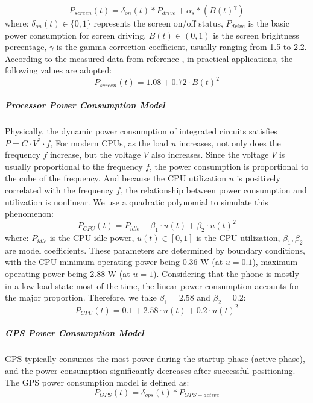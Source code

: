 \documentclass{mcmthesis}
\begin{document}
\begin{equation}
   P_{screen}(t)=\delta _{on}(t)*P_{drive}+\alpha_s*(B(t)^\gamma)
\end{equation}
where:
$\delta_{on}(t) \in \{0,1\}$ represents the screen on/off status,
$P_{drive}$ is the basic power consumption for screen driving,
$B(t) \in (0,1)$ is the screen brightness percentage,
$\gamma$ is the gamma correction coefficient, usually ranging from 1.5 to 2.2.
According to the measured data from reference \cite{Carroll2010Power},
 in practical applications, the following values are adopted:
\begin{equation}
    P_{screen}(t) = 1.08 + 0.72 \cdot B(t)^{2} 
\end{equation}
\subparagraph{Processor Power Consumption Model}
Physically, the dynamic power consumption of integrated circuits satisfies $P = C \cdot V^2 \cdot f$,
For modern CPUs, as the load $u$ increases, not only does the frequency $f$ increase, but the voltage $V$ also increases.
Since the voltage $V$ is usually proportional to the frequency $f$, the power consumption is proportional to the cube of the frequency.
And because the CPU utilization $u$ is positively correlated with the frequency $f$, the relationship between power consumption and utilization is nonlinear.
We use a quadratic polynomial to simulate this phenomenon:
\begin{equation}
    P_{CPU}(t) = P_{idle} + \beta _1 \cdot u(t) + \beta _2 \cdot u(t)^2
\end{equation}
where:
$P_{idle}$ is the CPU idle power,
$u(t) \in [0,1]$ is the CPU utilization,
$\beta _1, \beta _2$ are model coefficients.
These parameters are determined by boundary conditions,
with the CPU minimum operating power being 0.36 W (at $u=0.1$),
maximum operating power being 2.88 W (at $u=1$). 
Considering that the phone is mostly in a low-load state most of the time, the linear power consumption accounts for the major proportion. 
Therefore, we take $\beta_1=2.58$ and $\beta_2=0.2$:
\begin{equation}
    P_{CPU}(t) = 0.1 + 2.58 \cdot u(t) + 0.2 \cdot u(t)^2 
\end{equation}
\subparagraph{GPS Power Consumption Model}
GPS typically consumes the most power during the startup phase (active phase), and the power consumption significantly decreases after successful positioning. The GPS power consumption model is defined as:
\begin{equation}
P_{GPS}(t)=\delta _{gps}(t)*P_{GPS-active}
\end{equation}
\end{document}
